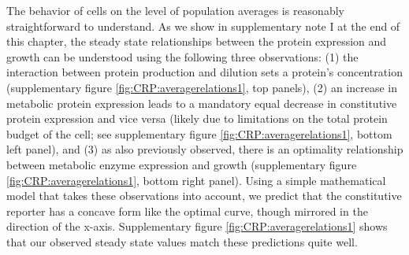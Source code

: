 The behavior of cells on the level of population averages is reasonably straightforward to understand.
%
As we show in supplementary note I at the end of this chapter, the steady state relationships between the protein expression and growth 
can be understood using %
the following three observations:
(1) the interaction between protein production and dilution sets a protein's concentration (supplementary figure \ref{fig:CRP:averagerelations1}, top panels), 
(2) an increase in metabolic protein expression leads to a mandatory equal decrease in constitutive protein expression and vice versa 
(likely due to limitations on the total protein budget of the cell; see supplementary figure \ref{fig:CRP:averagerelations1}, bottom left panel), 
and 
(3) as also previously observed, there is an optimality relationship between metabolic enzyme expression and growth (supplementary figure \ref{fig:CRP:averagerelations1}, bottom right panel).
%
Using a simple mathematical model that takes these observations into account,
we predict that the constitutive reporter has a concave form like the optimal curve, though mirrored in the direction of the x-axis.
%
Supplementary figure \ref{fig:CRP:averagerelations1} shows that our observed steady state values match these predictions quite well. 




























